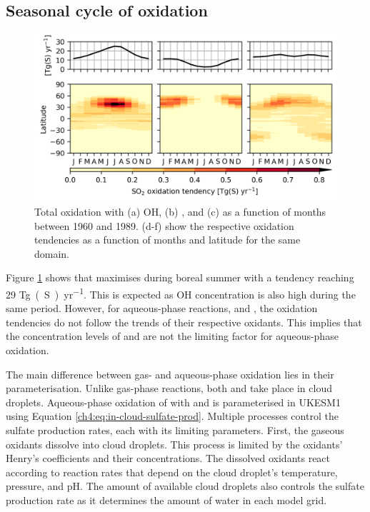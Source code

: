 \subsection{Seasonal cycle of oxidation}

\begin{figure}
    \centering
    \includegraphics{Chapter4/Figs/seasonal_oxidation_w_summary_histsst_pothole.png}
    \caption[Total tropospheric  oxidation tendencies as a function of latitude and months between 1960 and 1989]{Total  oxidation with (a) OH, (b) , and (c)  as a function of months between 1960 and 1989. (d-f) show the respective oxidation tendencies as a function of months and latitude for the same domain.}
    \label{fig:ch4:seasonal-oxidation}
\end{figure}

Figure \ref{fig:ch4:seasonal-oxidation} shows that  maximises during boreal summer with a tendency reaching 29 \unit{Tg(S)~yr^{-1}}. This is expected as OH concentration is also high during the same period. However, for aqueous-phase reactions,  and , the oxidation tendencies do not follow the trends of their respective oxidants. This implies that the concentration levels of  and  are not the limiting factor for aqueous-phase oxidation. 

The main difference between gas- and aqueous-phase oxidation lies in their parameterisation. Unlike gas-phase reactions, both  and  take place in cloud droplets. Aqueous-phase oxidation of  with  and  is parameterised in  UKESM1 using Equation \ref{ch4:eq:in-cloud-sulfate-prod}. Multiple processes control the sulfate production rates, each with its limiting parameters. First, the gaseous oxidants dissolve into cloud droplets. This process is limited by the oxidants' Henry's coefficients and their concentrations. The dissolved oxidants react according to reaction rates that depend on the cloud droplet's temperature, pressure, and pH. The amount of available cloud droplets also controls the sulfate production rate as it determines the amount of water in each model grid.

